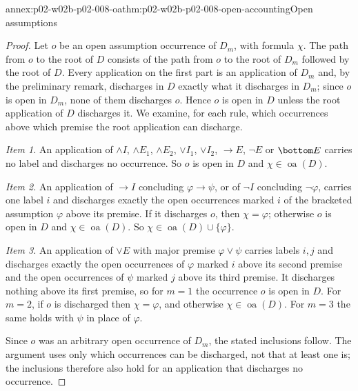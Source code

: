 \begin{annexitem}{annex:p02-w02b-p02-008-oa}{thm:p02-w02b-p02-008-open-accounting}{Open assumptions}
\begin{proof}
Let \(o\) be an open assumption occurrence of \(D_m\), with formula
\(\chi\).  The path from \(o\) to the root of \(D\) consists of the path from
\(o\) to the root of \(D_m\) followed by the root of \(D\).  Every
application on the first part is an application of \(D_m\) and, by the
preliminary remark, discharges in \(D\) exactly what it discharges in
\(D_m\); since \(o\) is open in \(D_m\), none of them discharges \(o\).
Hence \(o\) is open in \(D\) unless the root application of \(D\)
discharges it.  We examine, for each rule, which occurrences above which
premise the root application can discharge.

\emph{Item 1.}  An application of \(\land I\), \(\land E_1\), \(\land E_2\),
\(\lor I_1\), \(\lor I_2\), \(\to E\), \(\neg E\) or \(\bottom E\) carries no
label and discharges no occurrence.  So \(o\) is open in \(D\) and
\(\chi\in\operatorname{oa}(D)\).

\emph{Item 2.}  An application of \(\to I\) concluding \(\varphi\to\psi\), or
of \(\neg I\) concluding \(\neg\varphi\), carries one label \(i\) and
discharges exactly the open occurrences marked \(i\) of the bracketed
assumption \(\varphi\) above its premise.  If it discharges \(o\), then
\(\chi=\varphi\); otherwise \(o\) is open in \(D\) and
\(\chi\in\operatorname{oa}(D)\).  So \(\chi\in\operatorname{oa}(D)\cup\{\varphi\}\).

\emph{Item 3.}  An application of \(\lor E\) with major premise
\(\varphi\lor\psi\) carries labels \(i,j\) and discharges exactly the open
occurrences of \(\varphi\) marked \(i\) above its second premise and the open
occurrences of \(\psi\) marked \(j\) above its third premise.  It discharges
nothing above its first premise, so for \(m=1\) the occurrence \(o\) is open
in \(D\).  For \(m=2\), if \(o\) is discharged then \(\chi=\varphi\), and
otherwise \(\chi\in\operatorname{oa}(D)\).  For \(m=3\) the same holds with
\(\psi\) in place of \(\varphi\).

Since \(o\) was an arbitrary open occurrence of \(D_m\), the stated
inclusions follow.  The argument uses only which occurrences can be
discharged, not that at least one is; the inclusions therefore also hold for
an application that discharges no occurrence.
\end{proof}
\end{annexitem}

